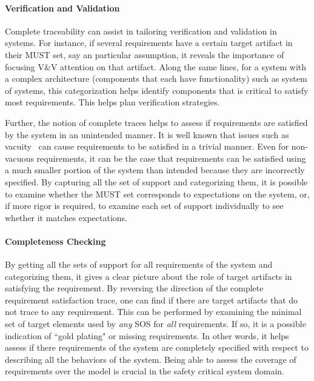 
\paragraph{Verification and Validation}

Complete traceability can assist in tailoring verification and validation in systems. For instance, if several requirements have a certain target artifact in their MUST set, say an particular assumption, it reveals the importance of focusing V\&V attention on that artifact. Along the same lines, for a system with a complex architecture (components that each have functionality) such as  system of systems, this categorization helps identify components that is critical to satisfy most requirements. This helps plan verification strategies.

Further, the notion of complete traces helps to assess if requirements are satisfied by the system in an unintended manner. It is well known that issues such as vacuity~\cite{Kupferman03:Vacuity} can cause requirements to be satisfied in a trivial manner. Even for non-vacuous requirements, it can be the case that requirements can be satisfied using a much smaller portion of the system than intended because they are incorrectly specified.  By capturing all the set of support and categorizing them, it is possible to examine whether the MUST set corresponds to expectations on the system, or, if more rigor is required, to examine each set of support individually to see whether it matches expectations.

\paragraph{Completeness Checking}

By getting all the sets of support for all requirements of the system and categorizing them,  it gives a clear picture about the role of target artifacts in satisfying the requirement.  By reversing the direction of the complete requirement satisfaction trace, one can find if there are target artifacts that do not trace to any requirement.  This can be performed by examining the minimal set of target elements used by {\em any} SOS for {\em all} requirements.  If so,  it is a possible indication of ``gold plating" or missing requirements. In other words, it helps assess if there requirements of the system are completely specified with respect to describing all the behaviors of the system. Being able to assess the coverage of requirements over the model is crucial in the safety critical system domain.


